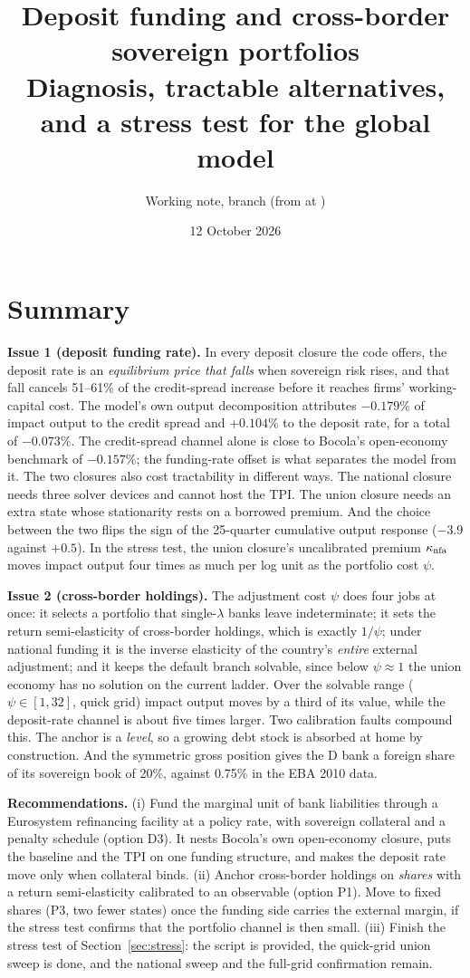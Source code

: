 \documentclass[11pt]{article}
\title{Deposit funding and cross-border sovereign portfolios\\[2pt]
\large Diagnosis, tractable alternatives, and a stress test for the global model}
\author{Working note, branch \code{analysis} (from \code{main} at \code{55e174d})}
\date{12 October 2026}
\begin{document}
\sloppy
\maketitle

\section*{Summary}

\textbf{Issue 1 (deposit funding rate).} In every deposit closure the code offers, the deposit
rate is an \emph{equilibrium price that falls} when sovereign risk rises, and that fall cancels
51--61\% of the credit-spread increase before it reaches firms' working-capital cost. The
model's own output decomposition attributes $-0.179\%$ of impact output to the credit spread
and $+0.104\%$ to the deposit rate, for a total of $-0.073\%$. The credit-spread channel alone
is close to Bocola's open-economy benchmark of $-0.157\%$; the funding-rate offset is what
separates the model from it. The two closures also cost tractability in different ways. The
national closure needs three solver devices and cannot host the TPI. The union closure needs an
extra state whose stationarity rests on a borrowed premium. And the choice between the two
flips the sign of the 25-quarter cumulative output response ($-3.9$ against $+0.5$). In the
stress test, the union closure's uncalibrated premium $\kappa_{\rm nfa}$ moves impact output four
times as much per log unit as the portfolio cost $\psi$.

\textbf{Issue 2 (cross-border holdings).} The adjustment cost $\psi$ does four jobs at once: it
selects a portfolio that single-$\lambda$ banks leave indeterminate; it sets the return
semi-elasticity of cross-border holdings, which is exactly $1/\psi$; under national funding
it is the inverse elasticity of the country's \emph{entire} external adjustment; and it keeps
the default branch solvable, since below $\psi\approx1$ the union economy has no solution on
the current ladder. Over the solvable range ($\psi\in[1,32]$, quick grid) impact output moves
by a third of its value, while the deposit-rate channel is about five times larger. Two calibration
faults compound this. The anchor is a \emph{level}, so a growing debt stock is absorbed at home
by construction. And the symmetric gross position gives the D bank a foreign share of its
sovereign book of 20\%, against 0.75\% in the EBA 2010 data.

\textbf{Recommendations.} (i) Fund the marginal unit of bank liabilities through a Eurosystem
refinancing facility at a policy rate, with sovereign collateral and a penalty schedule
(option D3). It nests Bocola's own open-economy closure, puts the baseline and the TPI on one
funding structure, and makes the deposit rate move only when collateral binds. (ii) Anchor
cross-border holdings on \emph{shares} with a return semi-elasticity calibrated to an observable
(option P1). Move to fixed shares (P3, two fewer states) once the funding side carries the
external margin, if the stress test confirms that the portfolio channel is then small.
(iii) Finish the stress test of Section~\ref{sec:stress}: the script is provided, the
quick-grid union sweep is done, and the national sweep and the full-grid confirmation remain.
\end{document}
